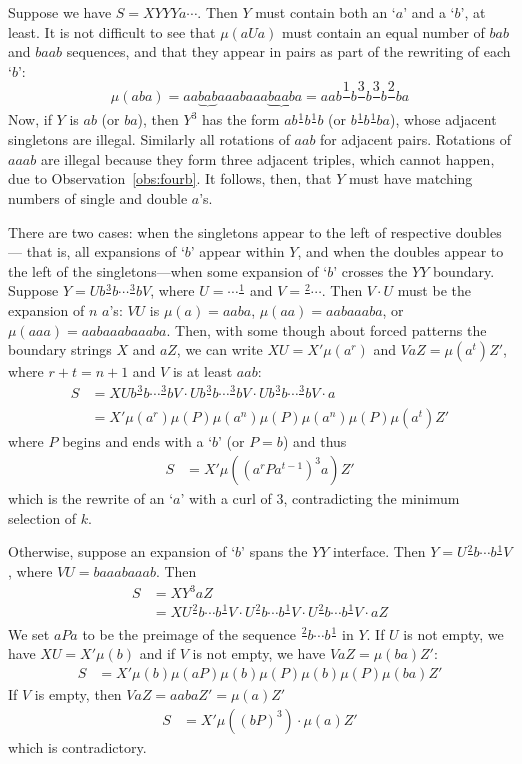 \documentclass[11pt]{article}
\def\ni{\noindent}
\def\s#1{\frac{#1}{}}
\def\q#1{`$#1$'}
\begin{document}
Suppose we have $S=XYYYa\cdots$.  Then $Y$ must contain both an \q{a} and a \q{b},
at least.  It is not difficult to see that $\mu(aUa)$ must contain an equal
number of $bab$ and $baab$ sequences, and that they appear in pairs as
part of the rewriting of each \q{b}: $$\mu(aba)=aa\underbrace{bab}aaabaaa\underbrace{baab}a=aab\s{1}b\s{3}b\s{3}b\s{2}ba$$
\ni Now, if $Y$ is $ab$ (or $ba$), then $Y^3$ has the form $ab\s{1}b\s{1}b$
(or $b\s{1}b\s{1}ba$), whose adjacent singletons are illegal.  Similarly
all rotations of $aab$ for adjacent pairs.  Rotations of $aaab$ are illegal
because they form three adjacent triples, which cannot happen, due to Observation~\ref{obs:fourb}.  It follows, then, that $Y$ must have matching numbers
of single and double $a$'s.  

There are two cases: when the singletons appear to the left of respective doubles---
that is, all expansions of \q{b} appear within $Y$, and when the doubles appear to the left of the singletons---when some expansion of \q{b} crosses the $YY$ boundary.
Suppose $Y=Ub\s{3}b\cdots \s{3}bV$, where $U=\cdots\s{1}$ and $V=\s{2}\cdots$.  Then $V\cdot U$ must be the expansion of $n$ $a$'s: $VU$ is $\mu(a)=aaba$, $\mu(aa)=aabaaaba$, or $\mu(aaa)=aabaaabaaaba$.
Then, with some though about forced patterns the boundary strings $X$ and $aZ$, we can write $XU=X'\mu(a^r)$ and $VaZ=\mu(a^t)Z'$, where
$r+t=n+1$ and $V$ is at least $aab$:
\begin{align*}
S&=XUb\s{3}b\cdots \s{3}bV\cdot Ub\s{3}b\cdots \s{3}bV\cdot  Ub\s{3}b\cdots \s{3}bV\cdot a\\
 &=X'\mu(a^r)\mu(P)\mu(a^n)\mu(P)\mu(a^n)\mu(P)\mu(a^t)Z'
\end{align*}
\ni where $P$ begins and ends with a \q{b} (or $P=b$) and thus
\begin{align*}
S &=X'\mu((a^rPa^{t-1})^3a)Z'
\end{align*}
\ni which is the rewrite of an \q{a} with a curl of 3, contradicting the minimum selection of $k$.

Otherwise, suppose an expansion of \q{b} spans the $YY$ interface.  Then $Y=U\s{2}b\cdots b\s{1}V$,
where $VU=baaabaaab$.  Then
\begin{align*}
S&=XY^3aZ\\
 &=XU\s{2}b\cdots b\s{1}V\cdot U\s{2}b\cdots b\s{1}V\cdot U\s{2}b\cdots b\s{1}V\cdot aZ
\end{align*}
\ni We set $aPa$ to be the preimage of the sequence $\s{2}b\cdots b\s{1}$ in $Y$. If $U$ is not empty, we have $XU=X'\mu(b)$ and if $V$ is not empty,
we have $VaZ=\mu(ba)Z'$:
\begin{align*}
S &=X'\mu(b)\mu(aP)\mu(b)\mu(P)\mu(b)\mu(P)\mu(ba)Z'
\end{align*}
\ni If $V$ is empty, then $VaZ=aabaZ'=\mu(a)Z'$
\begin{align*}
S &=X'\mu((bP)^3)\cdot \mu(a)Z'
\end{align*}
\ni which is contradictory.
\end{document}
